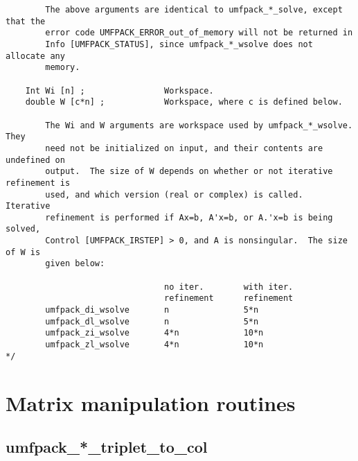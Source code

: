 \documentclass[11pt]{article}
\begin{document}
{\begin{verbatim}
        The above arguments are identical to umfpack_*_solve, except that the
        error code UMFPACK_ERROR_out_of_memory will not be returned in
        Info [UMFPACK_STATUS], since umfpack_*_wsolve does not allocate any
        memory.

    Int Wi [n] ;                Workspace.
    double W [c*n] ;            Workspace, where c is defined below.

        The Wi and W arguments are workspace used by umfpack_*_wsolve.  They
        need not be initialized on input, and their contents are undefined on
        output.  The size of W depends on whether or not iterative refinement is
        used, and which version (real or complex) is called.  Iterative
        refinement is performed if Ax=b, A'x=b, or A.'x=b is being solved,
        Control [UMFPACK_IRSTEP] > 0, and A is nonsingular.  The size of W is
        given below:

                                no iter.        with iter.
                                refinement      refinement
        umfpack_di_wsolve       n               5*n
        umfpack_dl_wsolve       n               5*n
        umfpack_zi_wsolve       4*n             10*n
        umfpack_zl_wsolve       4*n             10*n
*/
\end{verbatim}
}

\newpage
\section{Matrix manipulation routines}
\label{Manipulate}

\newpage
\subsection{umfpack\_*\_triplet\_to\_col}
\end{document}

